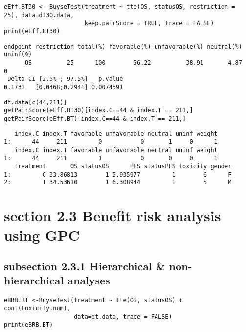 \documentclass[12pt]{article}
\begin{document}
\lstset{language=r,label= ,caption= ,captionpos=b,numbers=none}
\begin{lstlisting}
eEff.BT30 <- BuyseTest(treatment ~ tte(OS, statusOS, restriction = 25), data=dt30.data,
                       keep.pairScore = TRUE, trace = FALSE)
print(eEff.BT30)
\end{lstlisting}

\begin{verbatim}
endpoint restriction total(%) favorable(%) unfavorable(%) neutral(%) uninf(%)
      OS          25      100        56.22          38.91       4.87        0
 Delta CI [2.5% ; 97.5%]   p.value
0.1731   [0.0468;0.2941] 0.0074591
\end{verbatim}


\lstset{language=r,label= ,caption= ,captionpos=b,numbers=none}
\begin{lstlisting}
dt.data[c(44,211)]
getPairScore(eEff.BT30)[index.C==44 & index.T == 211,]
getPairScore(eEff.BT)[index.C==44 & index.T == 211,]
\end{lstlisting}

\begin{verbatim}
   index.C index.T favorable unfavorable neutral uninf weight
1:      44     211         0           0       1     0      1
   index.C index.T favorable unfavorable neutral uninf weight
1:      44     211         1           0       0     0      1
   treatment       OS statusOS      PFS statusPFS toxicity gender
1:         C 33.86813        1 5.935977         1        6      F
2:         T 34.53610        1 6.308944         1        5      M
\end{verbatim}

\section{section 2.3 Benefit risk analysis using GPC}
\label{sec:org9e97155}

\subsection{subsection 2.3.1 Hierarchical \& non-hierarchical analyses}
\label{sec:org68cca4d}
\lstset{language=r,label= ,caption= ,captionpos=b,numbers=none}
\begin{lstlisting}
eBRB.BT <-BuyseTest(treatment ~ tte(OS, statusOS) + cont(toxicity.num),
                    data=dt.data, trace = FALSE)
print(eBRB.BT)
\end{lstlisting}
\end{document}
